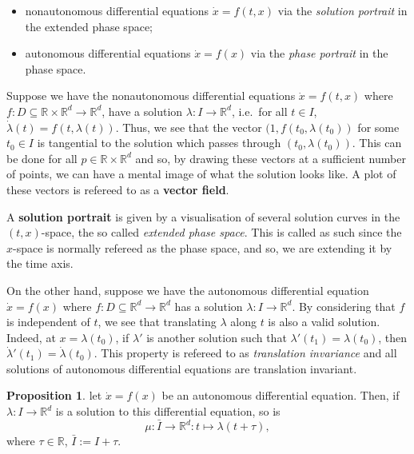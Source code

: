 \documentclass[
]{article}
\theoremstyle{definition}
\newtheorem{prop}{Proposition}
\theoremstyle{definition}
\begin{document}
\begin{itemize}
  \item nonautonomous differential equations \(\dot x = f(t, x)\) via the 
    \textit{solution portrait} in the extended phase space;
  \item autonomous differential equations \(\dot x = f(x)\) via the 
    \textit{phase portrait} in the phase space.
\end{itemize}

Suppose we have the nonautonomous differential equations
\(\dot x = f(t, x)\) where
\(f : D \subseteq \mathbb{R} \times \mathbb{R}^d \to \mathbb{R}^d\),
have a solution \(\lambda : I \to \mathbb{R}^d\), i.e.~for all
\(t \in I\), \(\dot \lambda(t) = f(t, \lambda(t))\). Thus, we see that
the vector \((1, f(t_0, \lambda(t_0))\) for some \(t_0 \in I\) is
tangential to the solution which passes through \((t_0, \lambda(t_0))\).
This can be done for all \(p \in \mathbb{R} \times \mathbb{R}^d\) and
so, by drawing these vectors at a sufficient number of points, we can
have a mental image of what the solution looks like. A plot of these
vectors is refereed to as a \textbf{vector field}.

A \textbf{solution portrait} is given by a visualisation of several
solution curves in the \((t, x)\)-space, the so called \emph{extended
phase space}. This is called as such since the \(x\)-space is normally
refereed as the phase space, and so, we are extending it by the time
axis.

On the other hand, suppose we have the autonomous differential equation
\(\dot x = f(x)\) where
\(f : D \subseteq \mathbb{R}^d \to \mathbb{R}^d\) has a solution
\(\lambda : I \to \mathbb{R}^d\). By considering that \(f\) is
independent of \(t\), we see that translating \(\lambda\) along \(t\) is
also a valid solution. Indeed, at \(x = \lambda(t_0)\), if \(\lambda'\)
is another solution such that \(\lambda'(t_1) = \lambda(t_0)\), then
\(\dot \lambda'(t_1) = \dot \lambda(t_0)\). This property is refereed to
as \emph{translation invariance} and all solutions of autonomous
differential equations are translation invariant.

\begin{prop}
  let \(\dot x = f(x)\) be an autonomous differential equation. Then, if 
  \(\lambda : I \to \mathbb{R}^d\) is a solution to this differential equation, 
  so is
  \[\mu : \bar{I} \to \mathbb{R}^d : t \mapsto \lambda(t + \tau),\]
  where \(\tau \in \mathbb{R}\), \(\bar{I} := I + \tau\).
\end{prop}
\proof
\end{document}
